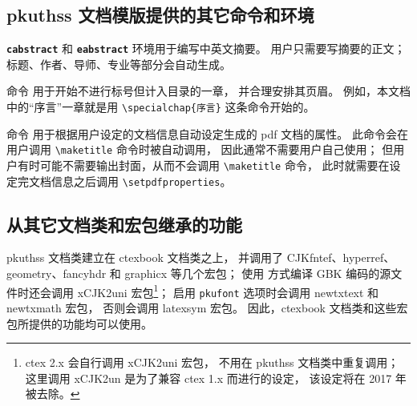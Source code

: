 \subsection{pkuthss 文档模版提供的其它命令和环境}\label{ssec:misc}

\texttt{\bfseries cabstract} 和 \texttt{\bfseries eabstract}
环境用于编写中英文摘要。
用户只需要写摘要的正文；标题、作者、导师、专业等部分会自动生成。

\texttt{\bfseries\string\specialchap} 命令
用于开始不进行标号但计入目录的一章，
并合理安排其页眉。%
例如，本文档中的“序言”一章就是用 \verb|\specialchap{序言}|
这条命令开始的。%

\texttt{\bfseries\string\setpdfproperties} 命令
用于根据用户设定的文档信息自动设定生成的 pdf 文档的属性。
此命令会在用户调用 \verb|\maketitle| 命令时被自动调用，
因此通常不需要用户自己使用；
但用户有时可能不需要输出封面，从而不会调用 \verb|\maketitle| 命令，
此时就需要在设定完文档信息之后调用 \verb|\setpdfproperties|。%

\subsection{从其它文档类和宏包继承的功能}\label{ssec:thirdparty}

pkuthss 文档类建立在 ctexbook\supercite{ctex} 文档类之上，
并调用了 CJKfntef、hyperref\supercite{hyperref}、%
geometry\supercite{geometry}、fancyhdr\supercite{fancyhdr}
和 graphicx\supercite{graphicx} 等几个宏包；
使用  方式编译 GBK 编码的源文件时还会调用
xCJK2uni\supercite{xCJK2uni} 宏包\footnote{%
	ctex 2.x 会自行调用 xCJK2uni 宏包，
	不用在 pkuthss 文档类中重复调用；
	这里调用 xCJK2un 是为了兼容 ctex 1.x 而进行的设定，
	该设定将在 2017 年被去除。%
}；
启用 \verb|pkufont| 选项时会调用
newtxtext 和 newtxmath\supercite{newtx} 宏包，
否则会调用 latexsym\supercite{latexsym} 宏包。
因此，ctexbook 文档类和这些宏包所提供的功能均可以使用。

